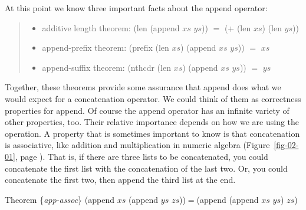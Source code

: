 
At this point we know three important facts about the \textsf{append} operator:
\begin{quote}
\begin{itemize}
\item additive length theorem: \textsf{(len (append $xs$ $ys$))} $=$ \textsf{(+ (len $xs$) (len $ys$))}\label{app-pfx-thm}
\item append-prefix theorem: \textsf{(prefix (len $xs$) (append $xs$ $ys$))} $=$ $xs$
\item append-suffix theorem: \textsf{(nthcdr (len $xs$) (append $xs$ $ys$))} $=$ $ys$
\end{itemize}
\end{quote}

Together, these theorems provide some assurance that \textsf{append} does what we
would expect for a concatenation operator.
We could think of them as
correctness properties
for \textsf{append}.
Of course the \textsf{append} operator has
an infinite variety of other properties, too.
Their relative importance depends on how we are using the operation.
A property that is sometimes important to know is that concatenation is associative,
like addition and multiplication in numeric algebra
(Figure~\ref{fig-02-01}, page \pageref{fig-02-01}).
That is, if there are three lists to be concatenated,
you could concatenate the first list with the concatenation of the last two.
Or, you could concatenate the first two, then append the third list at the end.

\begin{samepage}
\label{app-assoc}
\begin{center}
Theorem \{\emph{app-assoc}\} \textsf{(append $xs$ (append $ys$ $zs$))}$=$\textsf{(append (append $xs$ $ys$) $zs$)}
\end{center}
\end{samepage}

